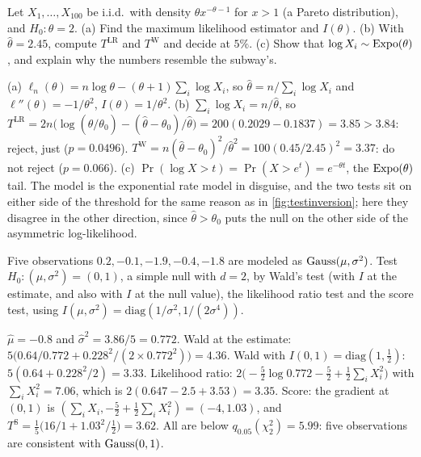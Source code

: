 \begin{exercise}
\label{ex:wlr-pareto}
Let $X_1, \ldots, X_{100}$ be i.i.d.\ with density $\theta x^{-\theta - 1}$ for $x > 1$ (a Pareto distribution), and $H_0: \theta = 2$. (a) Find the maximum likelihood estimator and $I(\theta)$. (b) With $\hat{\theta} = 2.45$, compute $T^{\mathrm{LR}}$ and $T^{\mathrm{W}}$ and decide at $5\%$. (c) Show that $\log X_i \sim \text{Expo}(\theta)$, and explain why the numbers resemble the subway's.
\end{exercise}
\begin{solution}
(a) $\ell_n(\theta) = n\log\theta - (\theta + 1)\sum_i\log X_i$, so $\hat{\theta} = n/\sum_i\log X_i$ and $\ell''(\theta) = -1/\theta^2$, $I(\theta) = 1/\theta^2$. (b) $\sum_i\log X_i = n/\hat{\theta}$, so $T^{\mathrm{LR}} = 2n\big(\log(\hat{\theta}/\theta_0) - (\hat{\theta} - \theta_0)/\hat{\theta}\big) = 200(0.2029 - 0.1837) = 3.85 > 3.84$: reject, just ($p = 0.0496$). $T^{\mathrm{W}} = n(\hat{\theta} - \theta_0)^2/\hat{\theta}^2 = 100(0.45/2.45)^2 = 3.37$: do not reject ($p = 0.066$). (c) $\Pr(\log X > t) = \Pr(X > e^t) = e^{-\theta t}$, the $\text{Expo}(\theta)$ tail. The model is the exponential rate model in disguise, and the two tests sit on either side of the threshold for the same reason as in \cref{fig:testinversion}; here they disagree in the other direction, since $\hat{\theta} > \theta_0$ puts the null on the other side of the asymmetric log-likelihood.
\end{solution}

\begin{exercise}
\label{ex:wlr-gauss2d}
Five observations $0.2, -0.1, -1.9, -0.4, -1.8$ are modeled as $\text{Gauss}(\mu, \sigma^2)$. Test $H_0: (\mu, \sigma^2) = (0, 1)$, a simple null with $d = 2$, by Wald's test (with $I$ at the estimate, and also with $I$ at the null value), the likelihood ratio test and the score test, using $I(\mu, \sigma^2) = \mathrm{diag}(1/\sigma^2, 1/(2\sigma^4))$.
\end{exercise}
\begin{solution}
$\hat{\mu} = -0.8$ and $\hat{\sigma}^2 = 3.86/5 = 0.772$. Wald at the estimate: $5\big(0.64/0.772 + 0.228^2/(2 \times 0.772^2)\big) = 4.36$. Wald with $I(0, 1) = \mathrm{diag}(1, \frac12)$: $5(0.64 + 0.228^2/2) = 3.33$. Likelihood ratio: $2\big(-\frac52\log 0.772 - \frac52 + \frac12\sum_i X_i^2\big)$ with $\sum_i X_i^2 = 7.06$, which is $2(0.647 - 2.5 + 3.53) = 3.35$. Score: the gradient at $(0, 1)$ is $(\sum_i X_i, -\frac{5}{2} + \frac12\sum_i X_i^2) = (-4, 1.03)$, and $T^{\mathrm{S}} = \frac15\big(16/1 + 1.03^2/\frac12\big) = 3.62$. All are below $q_{0.05}(\chi^2_2) = 5.99$: five observations are consistent with $\text{Gauss}(0, 1)$.
\end{solution}

